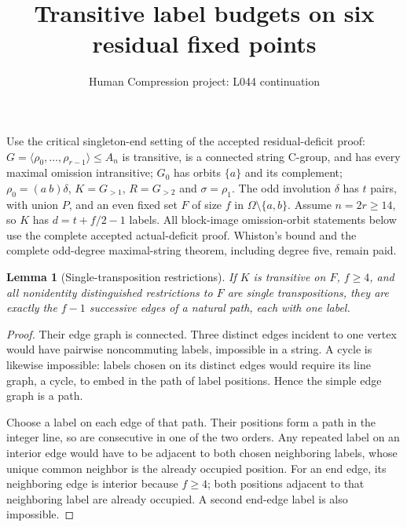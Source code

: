 \documentclass[11pt,a4paper]{article}
\title{Transitive label budgets on six residual fixed points}
\author{Human Compression project: L044 continuation}
\date{}
\newtheorem{lemma}{Lemma}
\newcommand{\gen}[1]{\langle#1\rangle}
\begin{document}
\maketitle
Use the critical singleton-end setting of the accepted residual-deficit
proof: $G=\gen{\rho_0,\ldots,\rho_{r-1}}\leq A_n$ is transitive,
is a connected string C-group, and has every maximal omission intransitive;
$G_0$ has orbits $\{a\}$ and its complement;
$\rho_0=(a\ b)\delta$, $K=G_{>1}$, $R=G_{>2}$ and $\sigma=\rho_1$.
The odd involution $\delta$ has $t$ pairs, with union $P$, and an even
fixed set $F$ of size $f$ in $\Omega\setminus\{a,b\}$.
Assume $n=2r\geq14$, so $K$ has $d=t+f/2-1$ labels.
All block-image omission-orbit statements below use the complete
accepted actual-deficit proof. Whiston's bound and the complete
odd-degree maximal-string theorem, including degree five, remain paid.

\begin{lemma}[Single-transposition restrictions]\label{single}
If $K$ is transitive on $F$, $f\geq4$, and all nonidentity distinguished
restrictions to $F$ are single transpositions, they are exactly the
$f-1$ successive edges of a natural path, each with one label.
\end{lemma}
\begin{proof}
Their edge graph is connected. Three distinct edges incident to one
vertex would have pairwise noncommuting labels, impossible in a string.
A cycle is likewise impossible: labels chosen on its distinct edges
would require its line graph, a cycle, to embed in the path of label
positions. Hence the simple edge graph is a path.

Choose a label on each edge of that path. Their positions form a path
in the integer line, so are consecutive in one of the two orders.
Any repeated label on an interior edge would have to be adjacent to
both chosen neighboring labels, whose unique common neighbor is the
already occupied position. For an end edge, its neighboring edge is
interior because $f\geq4$; both positions adjacent to that neighboring
label are already occupied. A second end-edge label is also impossible.
\end{proof}
\end{document}
